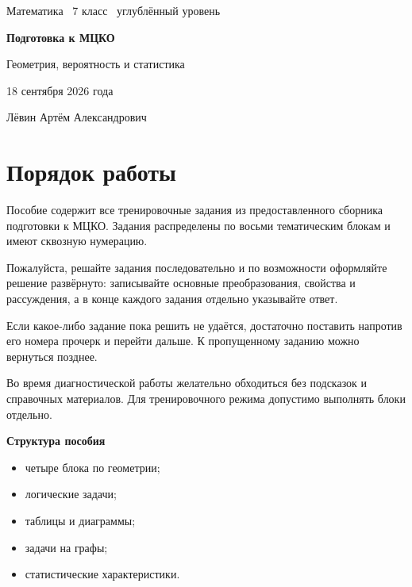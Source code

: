 \documentclass[a4paper,12pt]{article}
\begin{document}
\RaggedRight
\sloppy

\begin{titlepage}
\thispagestyle{empty}
\vspace*{24mm}
{\color{soft}\large Математика \textbullet\ 7 класс \textbullet\ углублённый уровень\par}
\vspace{17mm}
{\Huge\bfseries\color{accent}Подготовка к МЦКО\par}
\vspace{5mm}
{\LARGE Геометрия, вероятность и статистика\par}
\vspace{8mm}
{\Large 18 сентября 2026 года\par}
\vfill
{\large Лёвин Артём Александрович\par}
\vspace*{12mm}
\end{titlepage}

\section*{Порядок работы}

Пособие содержит все тренировочные задания из предоставленного сборника подготовки к МЦКО. Задания распределены по восьми тематическим блокам и имеют сквозную нумерацию.

Пожалуйста, решайте задания последовательно и по возможности оформляйте решение развёрнуто: записывайте основные преобразования, свойства и рассуждения, а в конце каждого задания отдельно указывайте ответ.

Если какое-либо задание пока решить не удаётся, достаточно поставить напротив его номера прочерк и перейти дальше. К пропущенному заданию можно вернуться позднее.

Во время диагностической работы желательно обходиться без подсказок и справочных материалов. Для тренировочного режима допустимо выполнять блоки отдельно.

\vspace{6mm}
{\large\bfseries\color{accent}Структура пособия}
\begin{itemize}
  \item четыре блока по геометрии;
  \item логические задачи;
  \item таблицы и диаграммы;
  \item задачи на графы;
  \item статистические характеристики.
\end{itemize}
\end{document}
